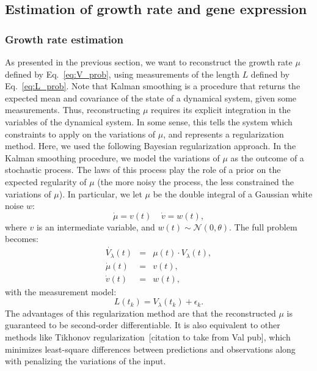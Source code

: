 \subsection{Estimation of growth rate and gene expression}

\subsubsection*{Growth rate estimation}

As presented in the previous section, we want to reconstruct the growth rate $\mu$ defined by Eq.~\ref{eq:V_prob}, using measurements of the length $L$ defined by Eq.~\ref{eq:L_prob}.
Note that Kalman smoothing is a procedure that returns the expected mean and covariance of the state of a dynamical system, given some measurements.
Thus, reconstructing $\mu$ requires its explicit integration in the variables of the dynamical system.
In some sense, this tells the system which constraints to apply on the variations of $\mu$, and represents a regularization method.
Here, we used the following Bayesian regularization approach.
In the Kalman smoothing procedure, we model the variations of $\mu$ as the outcome of a stochastic process.
The laws of this process play the role of a prior on the expected regularity of $\mu$ (the more noisy the process, the less constrained the variations of $\mu$).
In particular, we let $\mu$ be the double integral of a Gaussian white noise $w$:
\[
\dot{\mu} = v(t) \;\;\;\; \dot{v} = w(t),
\]
where $v$ is an intermediate variable, and $w(t) \sim \mathcal{N}(0, \theta)$.
The full problem becomes:
\begin{eqnarray}
\dot{V_\lambda}(t) &=& \mu (t) \cdot V_\lambda (t),\nonumber\\
\dot{\mu}(t) &=& v(t),\label{eq:full_mu_prob}\\
\dot{v}(t) &=& w(t),\nonumber
\end{eqnarray}
with the measurement model:
\begin{equation}
L(t_k) = V_\lambda(t_k) + \epsilon_k.
\end{equation}
The advantages of this regularization method are that the reconstructed $\mu$ is guaranteed to be second-order differentiable.
It is also equivalent to other methods like Tikhonov regularization~[citation to take from Val pub], which minimizes least-square differences between predictions and observations along with penalizing the variations of the input.


